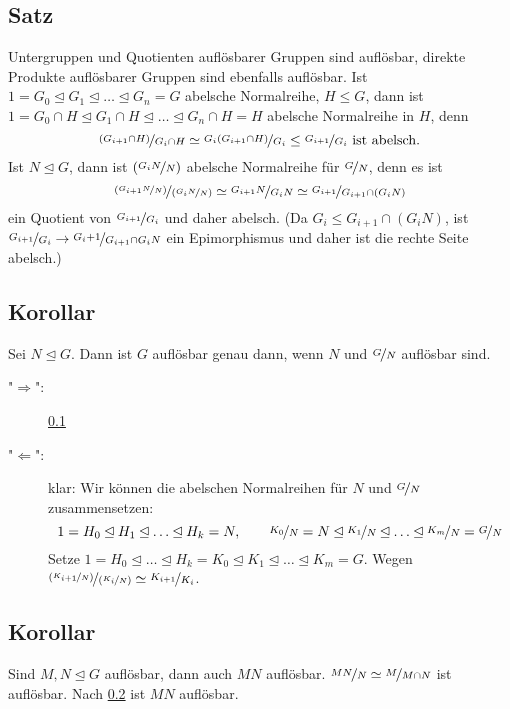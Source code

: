 \subsection[Satz: Auflösbarkeit von Untergruppen, Quotienten und Produkten auflösbarer Gruppen]{Satz} %
\label{sub:118}
Untergruppen und Quotienten auflösbarer Gruppen sind auflösbar, direkte Produkte auflösbarer Gruppen sind ebenfalls auflösbar.
Ist $1 = G_0 \unlhd G_1 \unlhd \ldots \unlhd G_n  = G$ abelsche Normalreihe, $H \le G$, dann ist $1 = G_0 \cap H \unlhd G_1 \cap H \unlhd \ldots  \unlhd G_n \cap H = H$
abelsche Normalreihe in $H$, denn 
\[
	\nicefrac{(G_{i+1} \cap H)}{G_i \cap H} \simeq \nicefrac{G_i (G_{i+1} \cap H)}{G_i} \le \nicefrac{G_{i+1}}{G_i} \text{ ist abelsch.}
\]
Ist $N \unlhd G$, dann ist $(\nicefrac{G_i N}{N})$ abelsche Normalreihe für $\nicefrac{G}{N}$, denn es ist 
\[
	\nicefrac{(\nicefrac{G_{i+1}N}{N})}{(\nicefrac{G_i N}{N})} \simeq \nicefrac{G_{i+1}N}{G_i N} \simeq \nicefrac{G_{i+1}}{G_{i+1} \cap (G_i N)}
\]
ein Quotient von $\nicefrac{G_{i+1}}{G_i}$ und daher abelsch. (Da $G_i \le G_{i+1} \cap (G_i N)$, ist $\nicefrac{G_{i+1}}{G_i} \to \nicefrac{G_i+1}{ G_{i+1} \cap G_i N}$
ein Epimorphismus und daher ist die rechte Seite abelsch.) \bewende

\subsection[Korollar: Auflösbarkeit ist äquivalent zur Auflösbarkeit von Normalteilern und Quotienten]{Korollar} %
\label{sub:119}
Sei $N  \unlhd G$. Dann ist $G$ auflösbar genau dann, wenn $N$ und $\nicefrac{G}{N}$ auflösbar sind. 
\begin{description}
	\item["$\Rightarrow $":] \ref{sub:118}
	\item["$\Leftarrow$":] klar: Wir können die abelschen Normalreihen für $N$ und $\nicefrac{G}{N}$ zusammensetzen:
	\[
		1 = H_0 \unlhd H_1 \unlhd \ldots \unlhd H_k = N, \qquad \nicefrac{K_0}{N} = N \unlhd \nicefrac{K_1}{N} \unlhd \ldots \unlhd \nicefrac{K_m}{N} = \nicefrac{G}{N}
	\]
	Setze $1= H_0 \unlhd \ldots \unlhd H_k = K_0 \unlhd K_1 \unlhd \ldots \unlhd K_m = G$. Wegen $\nicefrac{(\nicefrac{K_{i+1}}{N})}{(\nicefrac{K_i}{N})} \simeq \nicefrac{K_{i+1}}{K_i}$. \bewende
\end{description}

\subsection[Korollar: Das Produkt auflösbarer Normalteiler ist auflösbar]{Korollar} %
\label{sub:120}
Sind $M,N \unlhd G$ auflösbar, dann auch $M N$ auflösbar.
$\nicefrac{M N}{N} \simeq \nicefrac{M}{M \cap N}$ ist auflösbar. Nach \ref{sub:119} ist $M N$ auflösbar. \bewende

